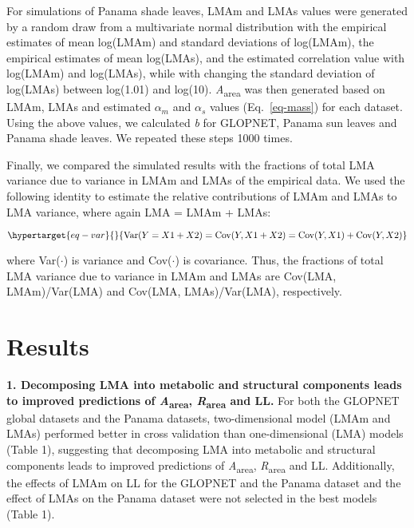 \documentclass[
  12pt,
  a4paper,
,tablecaptionabove
]{scrartcl}
\begin{document}
For simulations of Panama shade leaves, LMAm and LMAs values were
generated by a random draw from a multivariate normal distribution with
the empirical estimates of mean log(LMAm) and standard deviations of
log(LMAm), the empirical estimates of mean log(LMAs), and the estimated
correlation value with log(LMAm) and log(LMAs), while with changing the
standard deviation of log(LMAs) between log(1.01) and log(10).
\emph{A}\textsubscript{area} was then generated based on LMAm, LMAs and
estimated \(\alpha_m\) and \(\alpha_s\) values (Eq.~\ref{eq-mass}) for
each dataset. Using the above values, we calculated \emph{b} for
GLOPNET, Panama sun leaves and Panama shade leaves. We repeated these
steps 1000 times.

Finally, we compared the simulated results with the fractions of total
LMA variance due to variance in LMAm and LMAs of the empirical data. We
used the following identity to estimate the relative contributions of
LMAm and LMAs to LMA variance, where again LMA = LMAm + LMAs:

\begin{equation}\protect\hypertarget{eq-var}{}{
\mathrm{Var}(Y = X1 + X2) = \mathrm{Cov}(Y, X1+X2) = \mathrm{Cov}(Y,X1) + \mathrm{Cov}(Y,X2)
}\label{eq-var}\end{equation}

where Var(\(\cdot\)) is variance and Cov(\(\cdot\)) is covariance. Thus,
the fractions of total LMA variance due to variance in LMAm and LMAs are
Cov(LMA, LMAm)/Var(LMA) and Cov(LMA, LMAs)/Var(LMA), respectively.

\hypertarget{results}{%
\section{Results}\label{results}}

\textbf{1. Decomposing LMA into metabolic and structural components
leads to improved predictions of \emph{A}\textsubscript{area},
\emph{R}\textsubscript{area} and LL.} For both the GLOPNET global
datasets and the Panama datasets, two-dimensional model (LMAm and LMAs)
performed better in cross validation than one-dimensional (LMA) models
(Table 1), suggesting that decomposing LMA into metabolic and structural
components leads to improved predictions of
\emph{A}\textsubscript{area}, \emph{R}\textsubscript{area} and LL.
Additionally, the effects of LMAm on LL for the GLOPNET and the Panama
dataset and the effect of LMAs on the Panama dataset were not selected
in the best models (Table 1).
\end{document}
